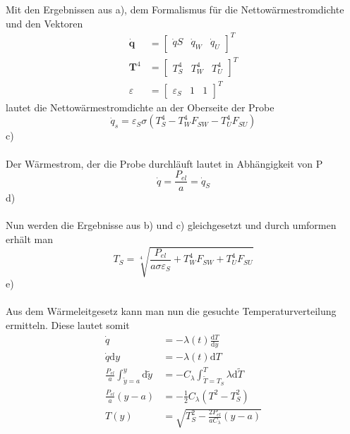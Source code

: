Mit den Ergebnissen aus a), dem Formalismus für die Nettowärmestromdichte und den Vektoren
\begin{align*}
	\dot{\textbf{q}} &= \begin{bmatrix}
		\dot{q}S & \dot{q}_W & \dot{q}_U
	\end{bmatrix}^T \\
	\textbf{T}^4 &= \begin{bmatrix}
		T_S^4 & T_W^4 & T_U^4
	\end{bmatrix}^T \\
	\varepsilon &= \begin{bmatrix}
		\varepsilon_S & 1 & 1
	\end{bmatrix}^T
\end{align*}
lautet die Nettowärmestromdichte an der Oberseite der Probe
\[
	\dot{q}_s = \varepsilon_S\sigma\left(T_S^4 - T_W^4F_{SW} - T_U^4F_{SU}\right)
\]
c)\\ \\
Der Wärmestrom, der die Probe durchläuft lautet in Abhängigkeit von P 
\[
	\dot{q} = \frac{P_{el}}{a} = \dot{q}_S
\]
d) \\ \\
Nun werden die Ergebnisse aus b) und c) gleichgesetzt und durch umformen erhält man
\[
	T_S = \sqrt[4]{\frac{P_{el}}{a\sigma \varepsilon_S} + T_W^4F_{SW} + T_U^4F_{SU}}
\]
e)\\ \\
Aus dem Wärmeleitgesetz kann man nun die gesuchte Temperaturverteilung ermitteln. Diese lautet somit
\begin{align*}
	\dot{q} &= -\lambda(t)\frac{\text{d}T}{\text{d}y} \\
	\dot{q}\text{d}y &= -\lambda(t)\text{d}T \\
	\frac{P_{el}}{a}\int_{\tilde{y} = a}^{y}\text{d}\tilde{y} &= -C_\lambda\int_{\tilde{T} = T_S}^{T}\lambda\text{d}\tilde{T} \\
	\frac{P_{el}}{a}(y - a) &= -\frac{1}{2}C_\lambda(T^2 - T_S^2) \\
	T(y) &= \sqrt{T_S^2 - \frac{2P_{el}}{aC_\lambda}(y - a)}
\end{align*}